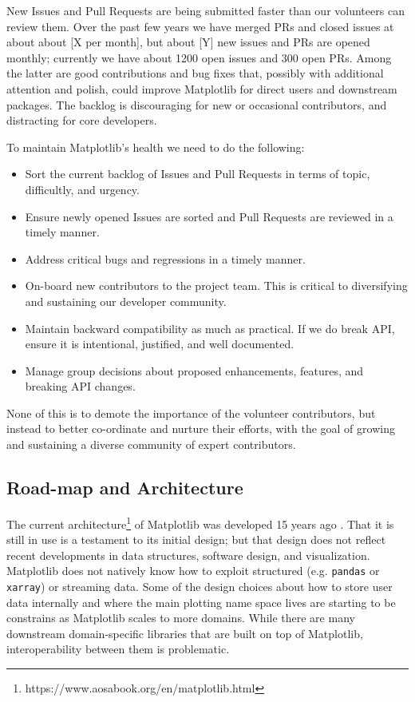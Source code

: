 \documentclass[11pt]{article}  %
\begin{document}
New Issues and Pull Requests are being submitted faster than our
volunteers can review them.
Over the past few years we have merged PRs and closed
issues at about about [X per month], but about [Y] new issues and PRs
are opened monthly; currently we have about 1200 open issues and
300 open PRs.
Among the latter are good contributions and bug fixes
that, possibly with additional attention and polish, could improve
Matplotlib for direct users and downstream packages.
The backlog is
discouraging for new or occasional contributors, and distracting for
core developers.

To maintain Matplotlib's health we need to do the following:

\begin{itemize}[noitemsep]
\item Sort the current backlog of Issues and Pull Requests
  in terms of topic, difficultly, and urgency.
\item Ensure newly opened Issues are sorted and Pull Requests
  are reviewed in a timely manner.
\item Address critical bugs and regressions in a timely manner.
\item On-board new contributors to the project team.  This is
  critical to diversifying and sustaining our developer community.
\item Maintain backward compatibility as much as practical.  If we do
  break API, ensure it is intentional, justified, and well documented.
\item Manage group decisions about proposed enhancements, features, and
  breaking API changes.
\end{itemize}

None of this is to demote the importance of the volunteer
contributors, but instead to better co-ordinate and nurture their
efforts, with the goal of growing and sustaining a diverse community
of expert contributors.

\subsection{Road-map and Architecture }

The current
architecture\footnote{https://www.aosabook.org/en/matplotlib.html} of
Matplotlib was developed 15 years ago \cite{Hunter:2007}.  That it is
still in use is a testament to its initial design; but that design
does not reflect recent developments in data structures, software
design, and visualization.  Matplotlib does not natively know how to
exploit structured (e.g. \texttt{pandas} or \texttt{xarray}) or
streaming data.  Some of the design choices about how to store user
data internally and where the main plotting name space lives are
starting to be constrains as Matplotlib scales to more domains.  While
there are many downstream domain-specific libraries that are built on
top of Matplotlib, interoperability between them is problematic.
\end{document}
